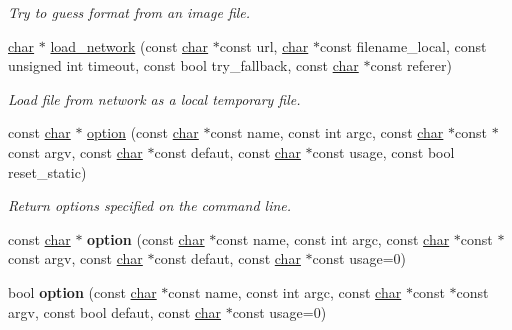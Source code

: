 \begin{DoxyCompactItemize}
\begin{DoxyCompactList}\small\item\em Try to guess format from an image file. \end{DoxyCompactList}\item 
\hyperlink{classchar}{char} $\ast$ \hyperlink{namespacecimg__library__suffixed_1_1cimg_a90c05fe6fc049cba75f3a12807e97158}{load\+\_\+network} (const \hyperlink{classchar}{char} $\ast$const url, \hyperlink{classchar}{char} $\ast$const filename\+\_\+local, const unsigned int timeout, const bool try\+\_\+fallback, const \hyperlink{classchar}{char} $\ast$const referer)
\begin{DoxyCompactList}\small\item\em Load file from network as a local temporary file. \end{DoxyCompactList}\item 
\mbox{\label{namespacecimg__library__suffixed_1_1cimg_a9b0d24fe7141f14b5322aad84c6ea51b}} 
const \hyperlink{classchar}{char} $\ast$ \hyperlink{namespacecimg__library__suffixed_1_1cimg_a9b0d24fe7141f14b5322aad84c6ea51b}{option} (const \hyperlink{classchar}{char} $\ast$const name, const int argc, const \hyperlink{classchar}{char} $\ast$const $\ast$const argv, const \hyperlink{classchar}{char} $\ast$const defaut, const \hyperlink{classchar}{char} $\ast$const usage, const bool reset\+\_\+static)
\begin{DoxyCompactList}\small\item\em Return options specified on the command line. \end{DoxyCompactList}\item 
\mbox{\label{namespacecimg__library__suffixed_1_1cimg_ab2d61b9c32a3083d9be8f33c51dea3c6}} 
const \hyperlink{classchar}{char} $\ast$ {\bfseries option} (const \hyperlink{classchar}{char} $\ast$const name, const int argc, const \hyperlink{classchar}{char} $\ast$const $\ast$const argv, const \hyperlink{classchar}{char} $\ast$const defaut, const \hyperlink{classchar}{char} $\ast$const usage=0)
\item 
\mbox{\label{namespacecimg__library__suffixed_1_1cimg_ad4c8d06ea82d8a2d6a618c0d678bca79}} 
bool {\bfseries option} (const \hyperlink{classchar}{char} $\ast$const name, const int argc, const \hyperlink{classchar}{char} $\ast$const $\ast$const argv, const bool defaut, const \hyperlink{classchar}{char} $\ast$const usage=0)

\end{DoxyCompactItemize}
